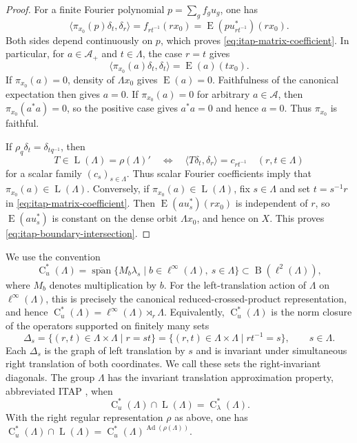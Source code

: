 \documentclass[11pt]{amsart}
\numberwithin{equation}{section}
\newcommand{\rL}{\operatorname{L}}
\newcommand{\rB}{\operatorname{B}}
\newcommand{\rC}{\operatorname{C}}
\newcommand{\rE}{\operatorname{E}}
\newcommand{\Ad}{\operatorname{Ad}}
\theoremstyle{definition}
\begin{document}
	\begin{proof}
		For a finite Fourier polynomial \(p=\sum_g f_gu_g\), one has
		\[
		\langle\pi_{x_0}(p)\delta_t,\delta_r\rangle
		=f_{rt^{-1}}(rx_0)
		=\rE(pu_{rt^{-1}}^*)(rx_0).
		\]
		Both sides depend continuously on \(p\), which proves
		\eqref{eq:itap-matrix-coefficient}. In particular, for \(a\in\mathcal A_+\)
		and \(t\in\Lambda\), the case \(r=t\) gives
		\[
		\langle\pi_{x_0}(a)\delta_t,\delta_t\rangle=\rE(a)(tx_0).
		\]
		If \(\pi_{x_0}(a)=0\), density of \(\Lambda x_0\) gives \(\rE(a)=0\).
		Faithfulness of the canonical expectation then gives \(a=0\). If
		\(\pi_{x_0}(a)=0\) for arbitrary \(a\in\mathcal A\), then
		\(\pi_{x_0}(a^*a)=0\), so the positive case gives \(a^*a=0\) and hence
		\(a=0\). Thus \(\pi_{x_0}\) is faithful.

		If \(\rho_q\delta_t=\delta_{tq^{-1}}\), then
		\[
		T\in\rL(\Lambda)=\rho(\Lambda)'
		\quad\Longleftrightarrow\quad
		\langle T\delta_t,\delta_r\rangle=c_{rt^{-1}}
		\quad(r,t\in\Lambda)
		\]
		for a scalar family \((c_s)_{s\in\Lambda}\). Thus scalar Fourier coefficients imply that \(\pi_{x_0}(a)\in\rL(\Lambda)\). Conversely, if \(\pi_{x_0}(a)\in\rL(\Lambda)\), fix \(s\in\Lambda\) and set \(t=s^{-1}r\) in \eqref{eq:itap-matrix-coefficient}. Then \(\rE(au_s^*)(rx_0)\) is independent of \(r\), so \(\rE(au_s^*)\) is constant on the dense orbit \(\Lambda x_0\), and hence on \(X\). This proves \eqref{eq:itap-boundary-intersection}.
	\end{proof}
	
	We use the convention
	\[
	\rC_u^*(\Lambda)
	=
	\overline{\operatorname{span}}
	\{M_b\lambda_s\mid b\in\ell^\infty(\Lambda),\ s\in\Lambda\}
	\subset\rB(\ell^2(\Lambda)),
	\]
	where \(M_b\) denotes multiplication by \(b\). For the left-translation action of \(\Lambda\) on \(\ell^\infty(\Lambda)\), this is precisely the canonical reduced-crossed-product representation, and hence
	\(\rC_u^*(\Lambda)=\ell^\infty(\Lambda)\rtimes_r\Lambda\).
	Equivalently, \(\rC_u^*(\Lambda)\) is the norm closure of the operators supported
	on finitely many sets
	\[
	\Delta_s=\{(r,t)\in\Lambda\times\Lambda\mid r=st\}
	=\{(r,t)\in\Lambda\times\Lambda\mid rt^{-1}=s\},
	\qquad s\in\Lambda.
	\]
	Each \(\Delta_s\) is the graph of left translation by \(s\) and is invariant
	under simultaneous right translation of both coordinates. We call these sets the
	right-invariant diagonals. The group \(\Lambda\) has the invariant translation
	approximation property, abbreviated ITAP \cite{Za06}, when
	\begin{equation}
		\rC_u^*(\Lambda)\cap\rL(\Lambda)
		=
		\rC^*_{\lambda}(\Lambda).
	\end{equation}
	With the right regular representation \(\rho\) as above, one has \(\rC_u^*(\Lambda)\cap\rL(\Lambda)=\rC_u^*(\Lambda)^{\Ad(\rho(\Lambda))}\).
	
\end{document}
